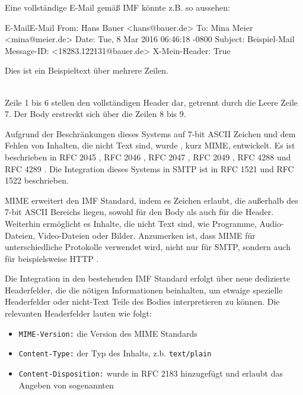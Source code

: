 Eine vollständige E-Mail gemäß IMF könnte z.B. so aussehen:
\\

\begin{minipage}{\linewidth}
\begin{mail}{E-Mail}{E-Mail}
From: Hans Bauer <hans@bauer.de>
To: Mina Meier <mina@meier.de>
Date: Tue, 8 Mar 2016 06:46:18 -0800
Subject: Beispiel-Mail
Message-ID: <18283.122131@bauer.de>
X-Mein-Header: True

Dies ist ein Beispieltext
über mehrere Zeilen.
\end{mail}
\end{minipage}
\\

Zeile 1 bis 6 stellen den vollständigen Header dar, getrennt durch die Leere Zeile 7. Der Body erstreckt sich über die Zeilen 8 bis 9.

Aufgrund der Beschränkungen dieses Systems auf 7-bit ASCII Zeichen und dem Fehlen von Inhalten, die nicht Text sind, wurde , kurz MIME, entwickelt. Es ist beschrieben in RFC 2045 ,
RFC 2046 ,
RFC 2047 ,
RFC 2049 ,
RFC 4288  und
RFC 4289 .
Die Integration dieses Systems in SMTP ist in RFC 1521 
und RFC 1522  beschrieben.

MIME erweitert den IMF Standard, indem es Zeichen erlaubt, die außerhalb des 7-bit ASCII Bereichs liegen, sowohl für den Body als auch für die Header. Weiterhin ermöglicht es Inhalte, die nicht Text sind, wie Programme, Audio-Dateien, Video-Dateien oder Bilder.
Anzumerken ist, dass MIME für unterschiedliche Protokolle verwendet wird, nicht nur für SMTP, sondern auch für beispielsweise HTTP .

Die Integration in den bestehenden IMF Standard erfolgt über neue dedizierte Headerfelder, die die nötigen Informationen beinhalten, um etwaige spezielle Headerfelder oder nicht-Text Teile des Bodies interpretieren zu können. Die relevanten Headerfelder lauten wie folgt:
\begin{itemize}
\item \verb#MIME-Version:# die Version des MIME Standards
\item \verb#Content-Type:# der Typ des Inhalts, z.b. \verb#text/plain#
\item \verb#Content-Disposition:# wurde in RFC 2183 
hinzugefügt und erlaubt das Angeben von sogenannten 
\end{itemize}

